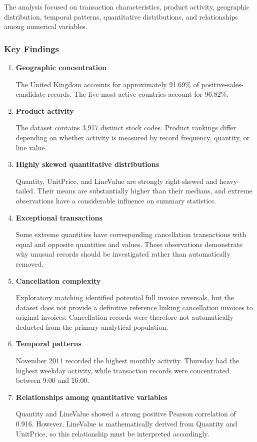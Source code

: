 \documentclass[11pt]{article}
\begin{document}
The analysis focused on transaction characteristics, product activity,
geographic distribution, temporal patterns, quantitative distributions,
and relationships among numerical variables.

\subsubsection{Key Findings}\label{key-findings}

\begin{enumerate}
\def\labelenumi{\arabic{enumi}.}
\item
  \textbf{Geographic concentration}

  The United Kingdom accounts for approximately 91.69\% of
  positive-sales-candidate records. The five most active countries
  account for 96.82\%.
\item
  \textbf{Product activity}

  The dataset contains 3,917 distinct stock codes. Product rankings
  differ depending on whether activity is measured by record frequency,
  quantity, or line value.
\item
  \textbf{Highly skewed quantitative distributions}

  Quantity, UnitPrice, and LineValue are strongly right-skewed and
  heavy-tailed. Their means are substantially higher than their medians,
  and extreme observations have a considerable influence on summary
  statistics.
\item
  \textbf{Exceptional transactions}

  Some extreme quantities have corresponding cancellation transactions
  with equal and opposite quantities and values. These observations
  demonstrate why unusual records should be investigated rather than
  automatically removed.
\item
  \textbf{Cancellation complexity}

  Exploratory matching identified potential full invoice reversals, but
  the dataset does not provide a definitive reference linking
  cancellation invoices to original invoices. Cancellation records were
  therefore not automatically deducted from the primary analytical
  population.
\item
  \textbf{Temporal patterns}

  November 2011 recorded the highest monthly activity. Thursday had the
  highest weekday activity, while transaction records were concentrated
  between 9:00 and 16:00.
\item
  \textbf{Relationships among quantitative variables}

  Quantity and LineValue showed a strong positive Pearson correlation of
  0.916. However, LineValue is mathematically derived from Quantity and
  UnitPrice, so this relationship must be interpreted accordingly.
\end{enumerate}
\end{document}
